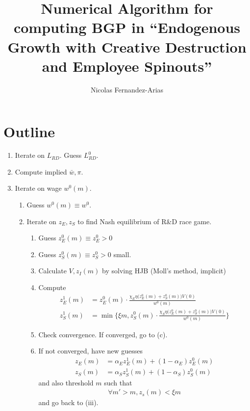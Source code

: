 \documentclass[12pt,english]{article}
\theoremstyle{remark}
\begin{document}
	
\title{Numerical Algorithm for computing BGP in ``Endogenous Growth with Creative Destruction and Employee Spinouts''}
\author{Nicolas Fernandez-Arias}
\maketitle

\section{Outline}

\begin{enumerate}
	\item Iterate on $L_{RD}$. Guess $L^0_{RD}$.  
	\item Compute implied $\bar{w},\pi$.
	\item Iterate on wage $w^0(m)$. 
	\begin{enumerate}
		\item Guess $w^0(m) \equiv w^0$.
		\item Iterate on $z_E,z_S$ to find Nash equilibrium of R\&D race game.
		\begin{enumerate}
			\item Guess $z_E^0(m) \equiv z_E^0 > 0$
			\item Guess $z_S^0(m) \equiv z_S^0 > 0$ small.
			\item Calculate $V,z_I(m)$ by solving HJB (Moll's method, implicit)
			\item Compute
			\begin{align*}
			z_E^1(m) &= z_E^0(m) \cdot \frac{\chi_E \eta \big(z_E^0(m) + z_S^0(m)\big)V(0)}{w^0(m)} \\
			z_S^1(m) &= \min\Bigg\{\xi m,z_S^0(m) \cdot \frac{\chi_S \eta \big(z_E^0(m) + z_S^0(m)\big)V(0)}{w^0(m)}\Bigg\}
			\end{align*}
			\item Check convergence. If converged, go to (c).
			\item If not converged, have new guesses
			\begin{align*}
			z_E(m) &= \alpha_E z_E^1(m) + (1-\alpha_E) z_E^0(m) \\
			z_S(m) &= \alpha_S z_S^1(m) + (1-\alpha_S) z_S^0(m) 
			\end{align*}
			and also threshold $m$ such that
			\begin{align*}
				\forall m' > m, z_s(m) < \xi m
			\end{align*}
			and go back to (iii). 
		\end{enumerate} 

\end{enumerate}
\end{enumerate}
\end{document}
